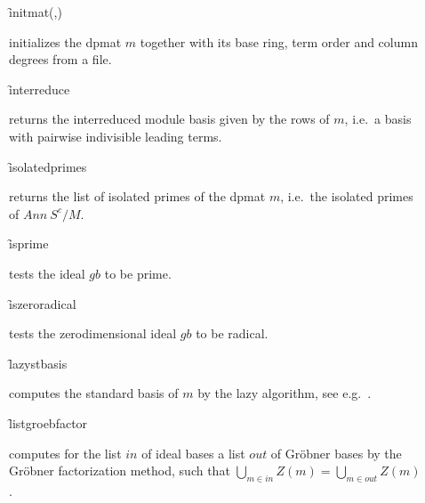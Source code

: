 \begin{description}
\item[]
  \begin{syntax}
    \f{initmat}(,)
  \end{syntax}
  \hypertarget{operator:INITMAT}{}
initializes the dpmat $m$ together with its base ring, term order
and column degrees from a file.

\item[]
  \begin{syntax}
    \f{interreduce} 
  \end{syntax}
  \hypertarget{operator:INTERREDUCE}{}
returns the interreduced module basis given by the rows of $m$,
i.e.\ a basis with pairwise indivisible leading terms.

\item[]
  \begin{syntax}
    \f{isolatedprimes} 
  \end{syntax}
  \hypertarget{operator:ISOLATEDPRIMES}{}
returns the list of isolated primes of the dpmat $m$, i.e.\ the
isolated primes of $Ann\ S^c/M$.

\item[]
  \begin{syntax}
    \f{isprime} 
  \end{syntax}
  \hypertarget{operator:ISPRIME}{}
tests the ideal $gb$ to be prime.

\item[]
  \begin{syntax}
    \f{iszeroradical} 
  \end{syntax}
  \hypertarget{operator:ISZERORADICAL}{}
tests the zerodimensional ideal $gb$ to be radical.

\item[]
  \begin{syntax}
    \f{lazystbasis} 
  \end{syntax}
  \hypertarget{operator:LAZYSTBASIS}{}
computes the standard basis of $m$ by the lazy algorithm, see
e.g.\ \cite{MoraPfisterTraverso:92}.

\item[]
  \begin{syntax}
    \f{listgroebfactor} 
  \end{syntax}
  \hypertarget{operator:LISTGROEBFACTOR}{}
computes for the list $in$ of ideal bases a list $out$ of Gr\"obner
bases by the Gr\"obner factorization method, such that
$\bigcup_{m\in in}Z(m) = \bigcup_{m\in out}Z(m)$.


\end{description}
